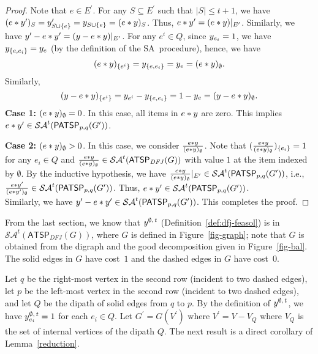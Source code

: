 \documentclass[11pt]{article}
\newcommand{\iSA}{\textsf{SA}}
\newcommand{\atspdfj}{\homog{\textsf{ATSP$_{\mathit{DFJ}}$}}}
\newcommand{\PATSP}{\textsf{PATSP}}
\newcommand{\saop}{\mathcal{SA}}
\newcommand{\homog}[1]{{#1}}
\begin{document}
\begin{proof}
Note that $e\in E^{\prime}$. For any $S\subseteq E^{\prime}$ such that
$|S|\leq t+1$, we have $(e*y^{\prime})_S=y^{\prime}_{S\cup
\{e\}}=y_{S\cup \{e\}}=(e*y)_S$. Thus,
$e*y^{\prime}=(e*y)|_{E^{\prime}}$.
Similarly, we have  $y^{\prime} -
e*y^{\prime}=(y - e*y)|_{E^{\prime}}$.
For any $e^{i}\in Q$, since $y_{e_i}=1$, we have
$y_{\{e,e_i\}}=y_e$ (by the definition of the \iSA\ procedure),
hence, we have
\[
(e*y)_{\{e^{i}\}}=y_{\{e,e_i\}}=y_e=(e*y)_\emptyset.
\]
Similarly,
\[
(y-e*y)_{\{e^{i}\}}=y_{e^i}-y_{\{e,e_i\}}=1-y_e=(y-e*y)_\emptyset.
\]
\noindent \textbf{Case 1:} $(e*y)_{\emptyset}=0$.
In this case, all items in $e*y$ are zero. This implies $e*\zveconly^{\prime}
\in \saop^{t}(\homog{\PATSP_{p, q}(G^{\prime})})$.

\noindent \textbf{Case 2:} $(e*y)_\emptyset>0$.
In this case, we consider $\frac{e*y}{(e*y)_\emptyset}$. Note that
$(\frac{e*y}{(e*y)_\emptyset})_{\{e_i\}}=1$ for any $e_i\in Q$ and
$\frac{e*\zveconly}{(e*\zveconly)_\emptyset}\in \saop^{t}(\homog{\atspdfj(G)})$ with value $1$
at the item indexed by $\emptyset$.
By the inductive hypothesis, we have
$\frac{e*\zveconly}{(e*\zveconly)_\emptyset}|_{E^{\prime}}\in
\saop^{t}(\homog{\PATSP_{p, q}(G^{\prime})})$, i.e.,
$\frac{e*\zveconly^{\prime}}{(e*\zveconly^{\prime})_\emptyset}\in
\saop^{t}(\homog{\PATSP_{p, q}(G^{\prime})})$. Thus, $e*\zveconly^{\prime} \in
\saop^{t}(\homog{\PATSP_{p, q}(G^{\prime})})$.
\\
Similarly, we have $\zveconly^{\prime} - e*\zveconly^{\prime}\in
\saop^{t}(\homog{\PATSP_{p, q}(G^{\prime})})$. This completes the proof.
\end{proof}

From the last section, we know that $y^{\emptyset,\,t}$
(Definition~\ref{def:dfj-feasol}) is in
$\saop^{t}(\homog{\atspdfj(G)})$, where $G$ is defined in
Figure~\ref{fig-graph};
note that $G$ is obtained from the
digraph and the good decomposition given in Figure~\ref{fig-bal}.
The solid edges in $G$ have cost~$1$ and the
dashed edges in $G$ have cost~$0$.

Let $q$ be the right-most vertex in the second row
	(incident to two dashed edges),
let $p$ be the  left-most vertex in the second row
	(incident to two dashed edges),
and let $Q$ be the dipath of solid edges from $q$ to $p$.
By the definition of $y^{\emptyset,\,t}$, we have
$y^{\emptyset,\,t}_{e_i}=1$ for each $e_i\in Q$. Let
$G^{\prime}=G(V^{\prime})$ where $V^{\prime}=V - V_Q$ where
$V_Q$ is the set of internal vertices of the dipath $Q$. The next
result is a direct corollary of Lemma~\ref{reduction}.
\end{document}
